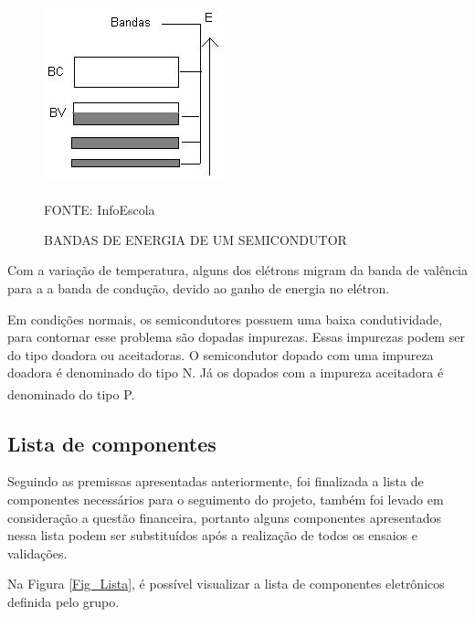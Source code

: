 \documentclass[
	12pt,				%
	openright,			%
	oneside,			%
	a4paper,			%
	english,			%
	french,				%
	spanish,			%
	brazil,				%
	oldfontcommands
	]{abntex2}
\begin{document}
	\begin{figure}[th]
		\caption{BANDAS DE ENERGIA DE UM SEMICONDUTOR}
		\label{Fig_bandas}
		\centering
		\includegraphics[width=0.3\linewidth]{./figs/banda}
			
		\begin{small}
			FONTE: InfoEscola\textsuperscript{\cite{semicondutores2}}
		\end{small}		
	\end{figure}
	
	Com a variação de temperatura, alguns dos elétrons migram da banda de valência para a a banda de condução, devido ao ganho de energia no elétron.

	Em condições normais, os semicondutores possuem uma baixa condutividade, para contornar esse problema são dopadas impurezas. Essas impurezas podem ser do tipo doadora ou aceitadoras. O semicondutor dopado com uma impureza doadora é denominado do tipo N. Já os dopados com a impureza aceitadora é denominado do tipo P.\textsuperscript{\cite{semicondutores2}}




	
	

\subsection[Lista de componentes]{Lista de componentes}

	Seguindo as premissas apresentadas anteriormente, foi finalizada a lista de componentes necessários para o seguimento do projeto, também foi levado em consideração a questão financeira, portanto alguns componentes apresentados nessa lista podem ser substituídos após a realização de todos os ensaios e validações.
	
	Na Figura \ref{Fig_Lista}, é possível visualizar a lista de componentes eletrônicos definida pelo grupo.
	
\end{document}
